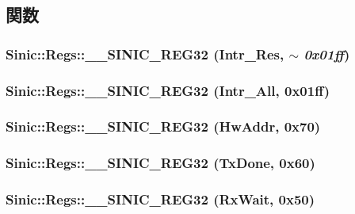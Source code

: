 \subsection{関数}
\hypertarget{namespaceSinic_1_1Regs_aa9827c004ca9c2b42740c79987e60278}{
\subsubsection[{\_\-\_\-SINIC\_\-REG32}]{\setlength{\rightskip}{0pt plus 5cm}Sinic::Regs::\_\-\_\-SINIC\_\-REG32 (Intr\_\-Res, \/  $\sim$ {\em 0x01ff})}}
\label{namespaceSinic_1_1Regs_aa9827c004ca9c2b42740c79987e60278}
\hypertarget{namespaceSinic_1_1Regs_af59b1adc2e9d7e568f47395397b62a28}{
\subsubsection[{\_\-\_\-SINIC\_\-REG32}]{\setlength{\rightskip}{0pt plus 5cm}Sinic::Regs::\_\-\_\-SINIC\_\-REG32 (Intr\_\-All, \/  0x01ff)}}
\label{namespaceSinic_1_1Regs_af59b1adc2e9d7e568f47395397b62a28}
\hypertarget{namespaceSinic_1_1Regs_a0edc4338948527dbb92f65cd30bdf13b}{
\subsubsection[{\_\-\_\-SINIC\_\-REG32}]{\setlength{\rightskip}{0pt plus 5cm}Sinic::Regs::\_\-\_\-SINIC\_\-REG32 (HwAddr, \/  0x70)}}
\label{namespaceSinic_1_1Regs_a0edc4338948527dbb92f65cd30bdf13b}
\hypertarget{namespaceSinic_1_1Regs_ad4b2b5daf8ff0c89d4c61ed6fa9f9593}{
\subsubsection[{\_\-\_\-SINIC\_\-REG32}]{\setlength{\rightskip}{0pt plus 5cm}Sinic::Regs::\_\-\_\-SINIC\_\-REG32 (TxDone, \/  0x60)}}
\label{namespaceSinic_1_1Regs_ad4b2b5daf8ff0c89d4c61ed6fa9f9593}
\hypertarget{namespaceSinic_1_1Regs_a4ef4b9c089872d14c224869000a19bc4}{
\subsubsection[{\_\-\_\-SINIC\_\-REG32}]{\setlength{\rightskip}{0pt plus 5cm}Sinic::Regs::\_\-\_\-SINIC\_\-REG32 (RxWait, \/  0x50)}}
